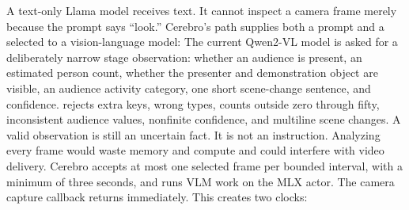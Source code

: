 {}\markdownRendererThematicBreak{}\markdownRendererInterblockSeparator
{}
\markdownRendererSectionEnd 
\markdownRendererSectionEnd \markdownRendererSectionBegin
{}\markdownRendererInterblockSeparator
{}A text-only Llama model receives text. It cannot inspect a camera frame merely\markdownRendererSoftLineBreak
{}because the prompt says “look.” Cerebro's  path supplies both a prompt\markdownRendererSoftLineBreak
{}and a selected  to a vision-language model:\markdownRendererInterblockSeparator
{}\markdownRendererInterblockSeparator
{}The current Qwen2-VL model is asked for a deliberately narrow stage\markdownRendererSoftLineBreak
{}observation: whether an audience is present, an estimated person count,\markdownRendererSoftLineBreak
{}whether the presenter and demonstration object are visible, an audience\markdownRendererSoftLineBreak
{}activity category, one short scene-change sentence, and confidence.\markdownRendererInterblockSeparator
{}\markdownRendererInterblockSeparator
{} rejects extra keys, wrong types, counts outside\markdownRendererSoftLineBreak
{}zero through fifty, inconsistent audience values, nonfinite confidence, and\markdownRendererSoftLineBreak
{}multiline scene changes. A valid observation is still an uncertain fact. It is\markdownRendererSoftLineBreak
{}not an instruction.\markdownRendererInterblockSeparator
{}\markdownRendererSectionBegin
{}\markdownRendererInterblockSeparator
{}Analyzing every frame would waste memory and compute and could interfere with\markdownRendererSoftLineBreak
{}video delivery. Cerebro accepts at most one selected frame per bounded interval,\markdownRendererSoftLineBreak
{}with a minimum of three seconds, and runs VLM work on the MLX actor. The camera\markdownRendererSoftLineBreak
{}capture callback returns immediately. This creates two clocks:\markdownRendererInterblockSeparator
{}\markdownRendererInterblockSeparator
